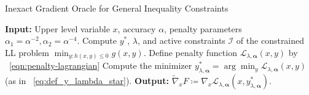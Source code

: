 \begin{algorithm}[h]\caption{Inexact Gradient Oracle for General Inequality Constraints}\label{alg:inexact-gradient-oracle}
\begin{algorithmic}[1]
\State \textbf{Input:}
Upper level variable $x$, accuracy $\alpha$, penalty parameters $\alpha_1 = {\alpha^{-2}}, \alpha_2 = {\alpha^{-4}}$.
\State Compute $y^*$, $\lambda$, and active constraints $\mathcal{I}$ of the constrained LL problem $\min_{y: h(x,y) \leq 0} g(x,y)$. \label{line:inner-optimization-problem} %
\State Define penalty function $\mathcal{L}_{\lambda, \boldsymbol{\alpha}}(x,y)$ by ~\cref{eqn:penalty-lagrangian}
\State Compute the minimizer $y^*_{\lambda, \boldsymbol{\alpha}} = \arg\min\nolimits_{y} \mathcal{L}_{\lambda, \boldsymbol{\alpha}}(x,y)$ (as in ~\cref{eq:def_y_lambda_star}).\label{line:lagrangian-optimization}
\State \textbf{Output:} $\widetilde{\nabla}_x F \coloneqq \nabla_x \mathcal{L}_{\lambda, \boldsymbol{\alpha}}(x,y^*_{\lambda, \boldsymbol{\alpha}})$. %
\end{algorithmic}
\end{algorithm}
